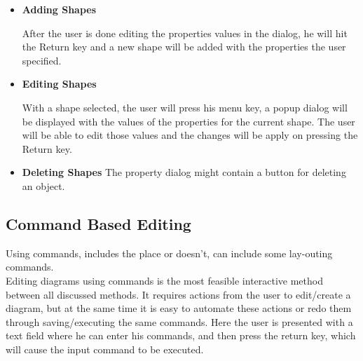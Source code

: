 \begin{itemize}
\begin{itemize}
	\item {\bf Adding Shapes}
	\par \noindent
	After the user is done editing the properties values in the dialog, he will hit the Return key and a new shape will be added with the properties the user specified.

	\item {\bf Editing Shapes}
	\par \noindent
	With a shape selected, the user will press his menu key, a popup dialog will be displayed with the values of the properties for the current shape. The user will be able to edit those values and the changes will be apply on pressing the Return key.

	\item {\bf Deleting Shapes}
	The property dialog might contain a button for deleting an object.

	\end{itemize}

\end{itemize}

\subsection{Command Based Editing}
Using commands, includes the place or doesn't, can include some lay-outing commands.\\
Editing diagrams using commands is the most feasible interactive method between all discussed methods. It requires actions from the user to edit/create a diagram, but at the same time it is easy to automate these actions or redo them through saving/executing the same commands. Here the user is presented with a text field where he can enter his commands, and then press the return key, which will cause the input command to be executed.

